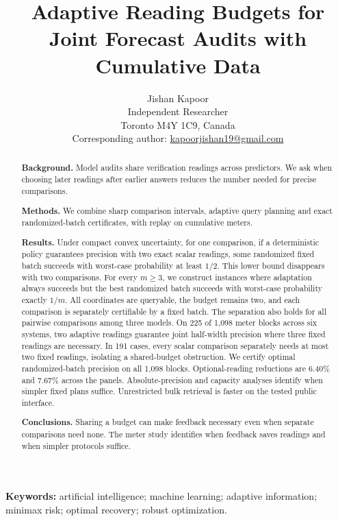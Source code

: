 \title{Adaptive Reading Budgets for Joint Forecast Audits with Cumulative Data}
\author{Jishan Kapoor\\Independent Researcher\\Toronto M4Y 1C9, Canada\\
Corresponding author: \href{mailto:kapoorjishan19@gmail.com}{kapoorjishan19@gmail.com}}
\date{}

\maketitle
\begin{abstract}
\textbf{Background.} Model audits share verification readings across
predictors. We ask when choosing later readings after earlier answers
reduces the number needed for precise comparisons.

\textbf{Methods.} We combine sharp comparison intervals, adaptive query
planning and exact randomized-batch certificates, with replay on cumulative meters.

\textbf{Results.} Under compact convex uncertainty, for one comparison,
if a deterministic policy guarantees
precision with two exact scalar readings, some randomized fixed batch succeeds with
worst-case probability at least $1/2$. This lower bound disappears with two
comparisons. For every $m\geq3$, we construct instances where adaptation
always succeeds but the best randomized batch succeeds with worst-case
probability exactly $1/m$. All coordinates are queryable, the budget remains
two, and each comparison is separately certifiable by a fixed batch.
The separation also holds for all pairwise comparisons among three models.
On 225 of 1,098 meter blocks across six systems, two adaptive readings
guarantee joint half-width precision where three fixed readings are necessary.
In 191 cases, every scalar comparison separately needs at most two fixed
readings, isolating a shared-budget obstruction. We certify optimal randomized-batch
precision on all 1,098 blocks. Optional-reading reductions are 6.40\%
and 7.67\% across the panels. Absolute-precision and capacity analyses
identify when simpler fixed plans suffice. Unrestricted bulk retrieval
is faster on the tested public interface.

\textbf{Conclusions.} Sharing a budget can make feedback necessary even when
separate comparisons need none. The meter study identifies when feedback
saves readings and when simpler protocols suffice.
\end{abstract}
\noindent\textbf{Keywords:} artificial intelligence; machine learning;
adaptive information; minimax risk; optimal recovery; robust optimization.

